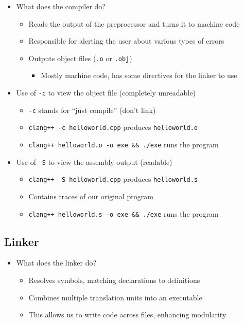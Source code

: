 \documentclass{article}
\begin{document}
\begin{itemize}
	\item What does the compiler do? \begin{itemize}
		\item Reads the output of the preprocessor and turns it to machine code
		\item Responsible for alerting the user about various types of errors
		\item Outputs object files (\texttt{.o} or \texttt{.obj}) \begin{itemize}
			\item Mostly machine code, has some directives for the linker to use
		\end{itemize}
	\end{itemize}
	\item Use of \texttt{-c} to view the object file (completely unreadable)\begin{itemize}
		\item \texttt{-c} stands for ``just compile'' (don't link)
		\item \texttt{clang++ -c helloworld.cpp} produces \texttt{helloworld.o}
		\item \texttt{clang++ helloworld.o -o exe \&\& ./exe} runs the program
	\end{itemize}
	\item Use of \texttt{-S} to view the assembly output (readable)\begin{itemize}
		\item \texttt{clang++ -S helloworld.cpp} produces \texttt{helloworld.s}
		\item Contains traces of our original program
		\item \texttt{clang++ helloworld.s -o exe \&\& ./exe} runs the program
	\end{itemize}
\end{itemize}

\subsection{Linker}

\begin{itemize}
	\item What does the linker do? \begin{itemize}
		\item Resolves symbols, matching declarations to definitions
		\item Combines multiple translation units into an executable
		\item This allows us to write code across files, enhancing modularity
	\end{itemize}
\end{itemize}
\end{document}
